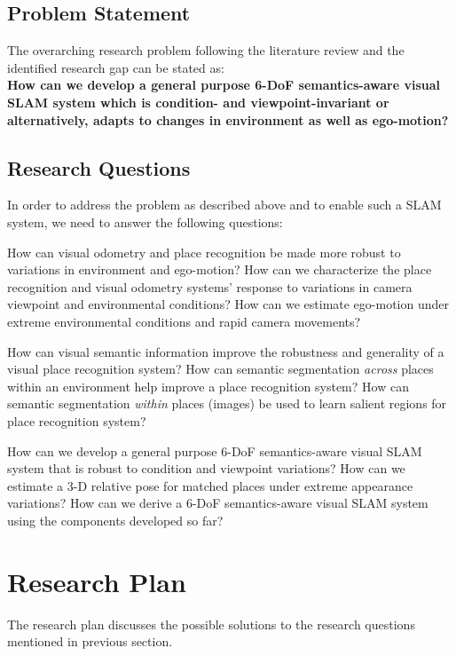 \documentclass{article}
\begin{document}
\subsection{Problem Statement}

The overarching research problem following the literature review and the identified research gap can be stated as: \\
\textbf{How can we develop a general purpose 6-DoF semantics-aware visual SLAM system which is condition- and viewpoint-invariant or alternatively, adapts to changes in environment as well as ego-motion?}

\subsection{Research Questions}

In order to address the problem as described above and to enable such a SLAM system, we need to answer the following questions:
\begin{outline}
 \1 How can visual odometry and place recognition be made more robust to variations in environment and ego-motion?
 \2 How can we characterize the place recognition and visual odometry systems' response to variations in camera viewpoint and environmental conditions?
 \2 How can we estimate ego-motion under extreme environmental conditions and rapid camera movements?
 
 \1 How can visual semantic information improve the robustness and generality of a visual place recognition system?
 \2 How can semantic segmentation \emph{across} places within an environment help improve a place recognition system?
 \2 How can semantic segmentation \emph{within} places (images) be used to learn salient regions for place recognition system?
 
 \1 How can we develop a general purpose 6-DoF semantics-aware visual SLAM system that is robust to condition and viewpoint variations?
 \2 How can we estimate a 3-D relative pose for matched places under extreme appearance variations?
 \2 How can we derive a 6-DoF semantics-aware visual SLAM system using the components developed so far?
  
\end{outline}


\section{Research Plan}
The research plan discusses the possible solutions to the research questions mentioned in previous section. 
\end{document}
